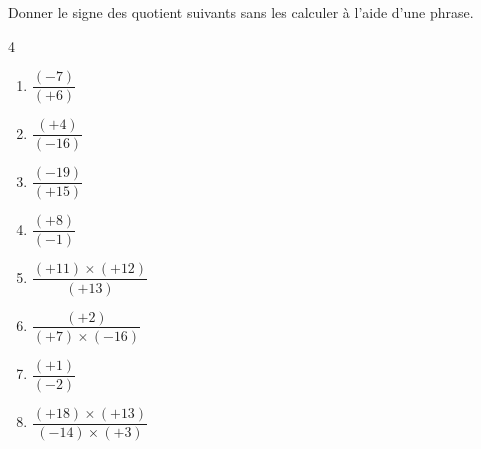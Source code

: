 \begin{exercice*}
    Donner le signe des quotient suivants sans les calculer à l'aide d'une phrase.
    \begin{multicols}4
      \begin{spacing}{2}
        \begin{enumerate}
            \item $ \dfrac{(-7)}{(+6)} $            
            \item $ \dfrac{(+4)}{(-16)} $            
            \item $ \dfrac{(-19)}{(+15)} $
            \item $ \dfrac{(+8)}{(-1)} $     
            \item $ \dfrac{(+11) \times (+12)}{(+13)} $
	    	    \item $ \dfrac{(+2)}{(+7) \times (-16)} $
	    	    \item $ \dfrac{(+1)}{(-2)} $
	    	    \item $ \dfrac{(+18) \times (+13)}{(-14) \times (+3)} $	
        \end{enumerate}
      \end{spacing}
    \end{multicols}
      
\end{exercice*}
